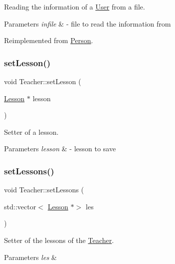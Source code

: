 Reading the information of a \mbox{\hyperlink{class_user}{User}} from a file. 


\begin{DoxyParams}{Parameters}
{\em infile} & -\/ file to read the information from \\
\hline
\end{DoxyParams}


Reimplemented from \mbox{\hyperlink{class_person_af07a032df8d56dddade4dc43960b536b}{Person}}.

\mbox{\label{class_teacher_aec95be6f77dc2b692627a6f4a5385971}} 
\subsubsection{\texorpdfstring{set\+Lesson()}{setLesson()}}
{\footnotesize\ttfamily void Teacher\+::set\+Lesson (\begin{DoxyParamCaption}\item[{\mbox{\hyperlink{class_lesson}{Lesson}} $\ast$}]{lesson }\end{DoxyParamCaption})}



Setter of a lesson. 


\begin{DoxyParams}{Parameters}
{\em lesson} & -\/ lesson to save \\
\hline
\end{DoxyParams}
\mbox{\label{class_teacher_a6c234671dbd738bee06f9a34bf11aca4}} 
\subsubsection{\texorpdfstring{set\+Lessons()}{setLessons()}}
{\footnotesize\ttfamily void Teacher\+::set\+Lessons (\begin{DoxyParamCaption}\item[{std\+::vector$<$ \mbox{\hyperlink{class_lesson}{Lesson}} $\ast$$>$}]{les }\end{DoxyParamCaption})}



Setter of the lessons of the \mbox{\hyperlink{class_teacher}{Teacher}}. 


\begin{DoxyParams}{Parameters}
{\em les} & \\
\hline
\end{DoxyParams}
\mbox{\label{class_teacher_a024a7daf22ee3ac310b69ba72fda5bb3}} 
